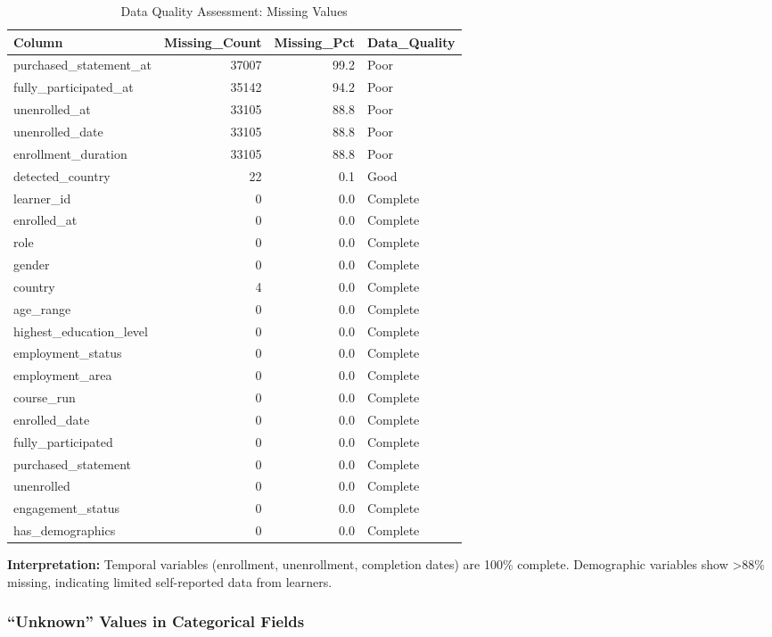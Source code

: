 \documentclass[
]{article}
\begin{document}
\begin{longtable}[t]{lrrl}
\caption{\label{tab:missing-values}Data Quality Assessment: Missing Values}\\
\toprule
Column & Missing\_Count & Missing\_Pct & Data\_Quality\\
\midrule
purchased\_statement\_at & 37007 & 99.2 & Poor\\
fully\_participated\_at & 35142 & 94.2 & Poor\\
unenrolled\_at & 33105 & 88.8 & Poor\\
unenrolled\_date & 33105 & 88.8 & Poor\\
enrollment\_duration & 33105 & 88.8 & Poor\\
\addlinespace
detected\_country & 22 & 0.1 & Good\\
learner\_id & 0 & 0.0 & Complete\\
enrolled\_at & 0 & 0.0 & Complete\\
role & 0 & 0.0 & Complete\\
gender & 0 & 0.0 & Complete\\
\addlinespace
country & 4 & 0.0 & Complete\\
age\_range & 0 & 0.0 & Complete\\
highest\_education\_level & 0 & 0.0 & Complete\\
employment\_status & 0 & 0.0 & Complete\\
employment\_area & 0 & 0.0 & Complete\\
\addlinespace
course\_run & 0 & 0.0 & Complete\\
enrolled\_date & 0 & 0.0 & Complete\\
fully\_participated & 0 & 0.0 & Complete\\
purchased\_statement & 0 & 0.0 & Complete\\
unenrolled & 0 & 0.0 & Complete\\
\addlinespace
engagement\_status & 0 & 0.0 & Complete\\
has\_demographics & 0 & 0.0 & Complete\\
\bottomrule
\end{longtable}

\textbf{Interpretation:} Temporal variables (enrollment, unenrollment,
completion dates) are 100\% complete. Demographic variables show
\textgreater88\% missing, indicating limited self-reported data from
learners.

\subsubsection{``Unknown'' Values in Categorical
Fields}\label{unknown-values-in-categorical-fields}
\end{document}
